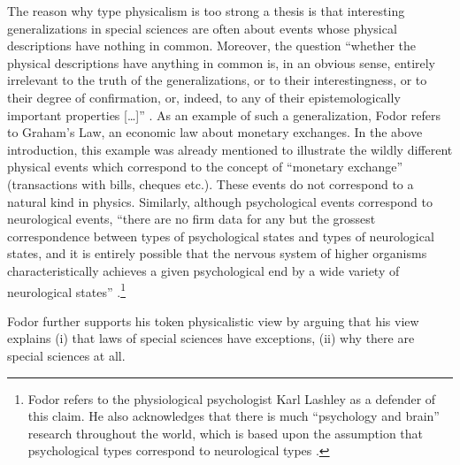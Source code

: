 \documentclass[output=paper]{langscibook}
\begin{document}
The reason why type physicalism is too strong a thesis is that interesting generalizations in special sciences are often about events whose physical descriptions have nothing in common. Moreover, the question ``whether the physical descriptions have anything in common is, in an obvious sense, entirely irrelevant to the truth of the generalizations, or to their interestingness, or to their degree of confirmation, or, indeed, to any of their epistemologically important properties […]'' \citep[103]{Fodor1974}. As an example of such a generalization, Fodor refers to Graham's Law, an economic law about monetary exchanges. In the above introduction, this example was already mentioned to illustrate the wildly different physical events which correspond to the concept of ``monetary exchange'' (transactions with bills, cheques etc.). These events do not correspond to a natural kind in physics. Similarly, although psychological events correspond to neurological events, ``there are no firm data for any but the grossest correspondence between types of psychological states and types of neurological states, and it is entirely possible that the nervous system of higher organisms characteristically achieves a given psychological end by a wide variety of neurological states'' \citep[105]{Fodor1974}.\footnote{Fodor refers to the physiological psychologist Karl Lashley as a defender of this claim. He also acknowledges that there is much ``psychology and brain'' research throughout the world, which is based upon the assumption that psychological types correspond to neurological types \citep[105]{Fodor1974}.\label{fn:elffers:physpsych}}

Fodor further supports his token physicalistic view by arguing that his view explains (i) that laws of special sciences have exceptions, (ii) why there are special sciences at all.
\end{document}
